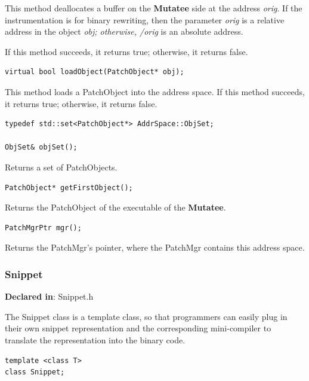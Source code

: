 \documentclass[11pt]{article}
\begin{document}
This method deallocates a buffer on the \textbf{Mutatee} side at the address \emph{orig}.
If the instrumentation is for binary rewriting, then the parameter \emph{orig} is a
relative address in the object \emph{obj; otherwise, /orig} is an absolute address.

If this method succeeds, it returns true; otherwise, it returns false.


\begin{verbatim}
virtual bool loadObject(PatchObject* obj);

\end{verbatim}



This method loads a PatchObject into the address space. If this method succeeds, it
returns true; otherwise, it returns false.


\begin{verbatim}
typedef std::set<PatchObject*> AddrSpace::ObjSet;

ObjSet& objSet();

\end{verbatim}



Returns a set of PatchObjects.


\begin{verbatim}
PatchObject* getFirstObject();

\end{verbatim}



Returns the PatchObject of the executable of the \textbf{Mutatee}.


\begin{verbatim}
PatchMgrPtr mgr();

\end{verbatim}



Returns the PatchMgr's pointer, where the PatchMgr contains this address space.

\subsubsection{Snippet}
\label{sec-3.2.2}

\textbf{Declared in}: Snippet.h

The Snippet class is a template class, so that programmers can easily plug in
their own snippet representation and the corresponding mini-compiler to
translate the representation into the binary code.


\begin{verbatim}
template <class T>
class Snippet;

\end{verbatim}
\end{document}

